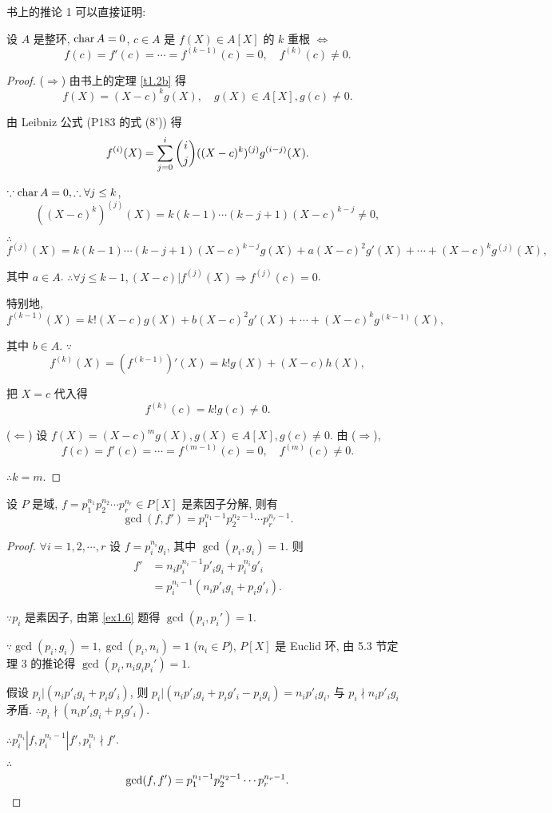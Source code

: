 \documentclass[color=black,device=normal,lang=cn,mode=geye]{elegantnote}
\begin{document}
书上的推论 1 可以直接证明:
\begin{theorem}[书上的推论 1]
    设 $A$ 是整环, $\operatorname{char} A=0$, $c\in A$ 是 $f(X)\in A[X]$ 的 $k$ 重根 $\Leftrightarrow$
    \[f(c)=f'(c)=\cdots=f^{(k-1)}(c)=0,\quad f^{(k)}(c)\neq0.\]
\end{theorem}
\begin{proof}
    ($\Rightarrow$) 由书上的定理 \ref{t1.2b} 得
    \[f(X)=(X-c)^kg(X),\quad g(X)\in A[X],g(c)\neq0.\]

    由 Leibniz 公式 (P183 的式 (8')) 得
    \[f^{(i)}(X)=\sum\limits_{j=0}^i\dbinom{i}{j}((X-c)^k)^{(j)}g^{(i-j)}(X).\]

    $\because\operatorname{char} A=0,\therefore\forall j\leq k$,
    \[((X-c)^k)^{(j)}(X)=k(k-1)\cdots(k-j+1)(X-c)^{k-j}\neq0,\]

    $\therefore$
    \[f^{(j)}(X)=k(k-1)\cdots(k-j+1)(X-c)^{k-j}g(X)+a(X-c)^2g'(X)+\cdots+(X-c)^kg^{(j)}(X),\]

    其中 $a\in A$.
    $\therefore\forall j\leq k-1,(X-c)|f^{(j)}(X)\Rightarrow f^{(j)}(c)=0$.

    特别地,
    \[f^{(k-1)}(X)=k!(X-c)g(X)+b(X-c)^2g'(X)+\cdots+(X-c)^kg^{(k-1)}(X),\]

    其中 $b\in A$. $\because$
    \[f^{(k)}(X)=(f^{(k-1)})'(X)=k!g(X)+(X-c)h(X),\]

    把 $X=c$ 代入得
    \[f^{(k)}(c)=k!g(c)\neq0.\]

    ($\Leftarrow$) 设 $f(X)=(X-c)^mg(X),g(X)\in A[X],g(c)\neq0$. 由 ($\Rightarrow$),
    \[f(c)=f'(c)=\cdots=f^{(m-1)}(c)=0,\quad f^{(m)}(c)\neq0.\]

    $\therefore k=m$.
\end{proof}
\begin{theorem}[书上的推论 2]
    设 $P$ 是域, $f=p_1^{n_1}p_2^{n_2}\cdots p_r^{n_r}\in P[X]$ 是素因子分解, 则有
    \[\gcd(f,f')=p_1^{n_1-1}p_2^{n_2-1}\cdots p_r^{n_r-1}.\]
\end{theorem}
\begin{proof}
    $\forall i=1,2,\cdots,r$ 设 $f=p_i^{n_i}g_i$, 其中 $\gcd(p_i,g_i)=1$. 则
    \begin{align*}
        f' & =n_ip_i^{n_i-1}p'_ig_i+p_i^{n_i}g'_i \\
        & =p_i^{n_i-1}(n_ip'_ig_i+p_ig'_i).
    \end{align*}

    $\because p_i$ 是素因子, 由第 \ref{ex1.6} 题得 $\gcd(p_i,p_i')=1$.

    $\because\gcd(p_i,g_i)=1,\gcd(p_i,n_i)=1$ ($n_i\in P$), $P[X]$ 是 Euclid 环, 由 5.3 节定理 3 的推论得 $\gcd(p_i,n_ig_ip_i')=1$.

    假设 $p_i|(n_ip'_ig_i+p_ig'_i)$, 则 $p_i|(n_ip'_ig_i+p_ig'_i-p_ig_i)=n_ip'_ig_i$, 与 $p_i\nmid n_ip'_ig_i$ 矛盾. $\therefore p_i\nmid(n_ip'_ig_i+p_ig'_i)$.

    $\therefore p_i^{n_i}|f,p_i^{n_i-1}|f',p_i^{n_i}\nmid f'$.

    $\therefore$
    \[\gcd(f,f')=p_1^{n_1-1}p_2^{n_2-1}\cdots p_r^{n_r-1}.\qedhere\]
\end{proof}
\end{document}
